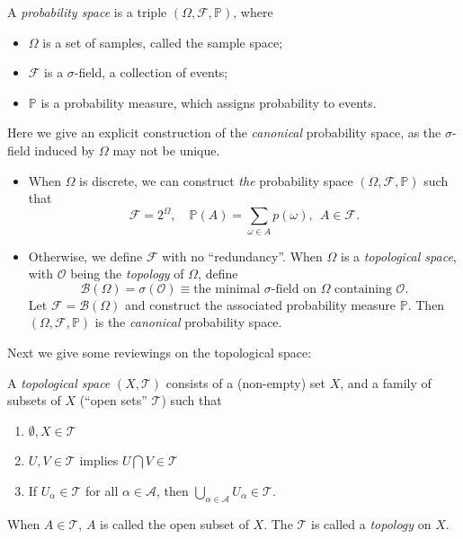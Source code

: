 \begin{definition}
A \emph{probability space} is a triple $(\Omega,\mathcal{F},\mathbb{P})$, where
\begin{itemize}
\item
$\Omega$ is a set of samples, called the sample space;
\item
$\mathcal{F}$ is a $\sigma$-field, a collection of events;
\item
$\mathbb{P}$ is a probability measure, which assigns probability to events.
\end{itemize}
\end{definition}
\begin{remark}
Here we give an explicit construction of the \emph{canonical} probability space, as 
the $\sigma$-field induced by $\Omega$ may not be unique.
\begin{itemize}
\item
When $\Omega$ is discrete, we can construct \emph{the} probability space $(\Omega,\mathcal{F},\mathbb{P})$ such that
\[
\mathcal{F}=2^{\Omega},
\quad
\mathbb{P}(A)=\sum_{\omega\in A}p(\omega),~~A\in\mathcal{F}.
\]
\item
Otherwise, we define $\mathcal{F}$ with no ``redundancy''.
When $\Omega$ is a \emph{topological space}, with $\mathcal{O}$ being the \emph{topology} of $\Omega$, define
\[
\mathcal{B}(\Omega)=\sigma(\mathcal{O})\equiv
\text{the minimal $\sigma$-field on $\Omega$ containing $\mathcal{O}$}.
\]
Let $\mathcal{F}=\mathcal{B}(\Omega)$ and construct the associated probability measure $\mathbb{P}$.
Then $(\Omega,\mathcal{F},\mathbb{P})$ is the \emph{canonical} probability space.
\end{itemize}
\end{remark}
Next we give some reviewings on the topological space:
\begin{definition}
A \emph{topological space} $(X,\mathcal{T})$ consists of a (non-empty) set $X$, and a family of subsets of $X$ (``open sets'' $\mathcal{T}$) such that
\begin{enumerate}
\item
$\emptyset,X\in\mathcal{T}$
\item
$U,V\in\mathcal{T}$ implies $U\bigcap V\in \mathcal{T}$
\item
If $U_\alpha\in\mathcal{T}$ for all $\alpha\in\mathcal{A}$, then $\bigcup_{\alpha\in\mathcal{A}}U_\alpha\in\mathcal{T}$.
\end{enumerate}
When $A\in\mathcal{T}$, $A$ is called the open subset of $X$. The $\mathcal{T}$ is called a \emph{topology} on $X$.
\end{definition}

